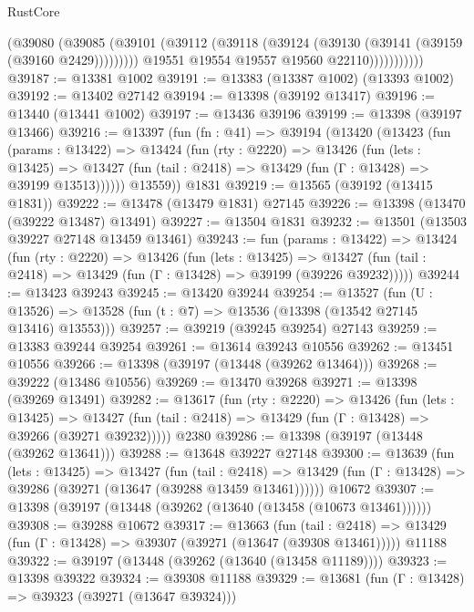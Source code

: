 \begin{lexlean}{RustCore}
\begin{coremodule}
                        (@39080
                          (@39085
                            (@39101
                              (@39112 (@39118 (@39124 (@39130 (@39141 (@39159 (@39160 @2429)))))))))
                          @19551
                          @19554
                          @19557
                          @19560
                          @22110)))))))))))
@39187 := @13381 @1002
@39191 := @13383 (@13387 @1002) (@13393 @1002)
@39192 := @13402 @27142
@39194 := @13398 (@39192 @13417)
@39196 := @13440 (@13441 @1002)
@39197 := @13436 @39196
@39199 := @13398 (@39197 @13466)
@39216 := @13397
    (fun (fn : @41) =>
    @39194
      (@13420
        (@13423
          (fun (params : @13422) =>
          @13424
            (fun (rty : @2220) =>
            @13426
              (fun (lets : @13425) =>
              @13427 (fun (tail : @2418) => @13429 (fun (Γ : @13428) => @39199 @13513))))))
        @13559))
    @1831
@39219 := @13565 (@39192 (@13415 @1831))
@39222 := @13478 (@13479 @1831) @27145
@39226 := @13398 (@13470 (@39222 @13487) @13491)
@39227 := @13504 @1831
@39232 := @13501 (@13503 @39227 @27148 @13459 @13461)
@39243 := fun (params : @13422) =>
  @13424
    (fun (rty : @2220) =>
    @13426
      (fun (lets : @13425) =>
      @13427 (fun (tail : @2418) => @13429 (fun (Γ : @13428) => @39199 (@39226 @39232)))))
@39244 := @13423 @39243
@39245 := @13420 @39244
@39254 := @13527
    (fun (U : @13526) => @13528 (fun (t : @7) => @13536 (@13398 (@13542 @27145 @13416) @13553)))
@39257 := @39219 (@39245 @39254) @27143
@39259 := @13383 @39244 @39254
@39261 := @13614 @39243 @10556
@39262 := @13451 @10556
@39266 := @13398 (@39197 (@13448 (@39262 @13464)))
@39268 := @39222 (@13486 @10556)
@39269 := @13470 @39268
@39271 := @13398 (@39269 @13491)
@39282 := @13617
    (fun (rty : @2220) =>
    @13426
      (fun (lets : @13425) =>
      @13427 (fun (tail : @2418) => @13429 (fun (Γ : @13428) => @39266 (@39271 @39232)))))
    @2380
@39286 := @13398 (@39197 (@13448 (@39262 @13641)))
@39288 := @13648 @39227 @27148
@39300 := @13639
    (fun (lets : @13425) =>
    @13427
      (fun (tail : @2418) =>
      @13429 (fun (Γ : @13428) => @39286 (@39271 (@13647 (@39288 @13459 @13461))))))
    @10672
@39307 := @13398 (@39197 (@13448 (@39262 (@13640 (@13458 (@10673 @13461))))))
@39308 := @39288 @10672
@39317 := @13663
    (fun (tail : @2418) => @13429 (fun (Γ : @13428) => @39307 (@39271 (@13647 (@39308 @13461)))))
    @11188
@39322 := @39197 (@13448 (@39262 (@13640 (@13458 @11189))))
@39323 := @13398 @39322
@39324 := @39308 @11188
@39329 := @13681 (fun (Γ : @13428) => @39323 (@39271 (@13647 @39324)))

\end{coremodule}
\end{lexlean}
